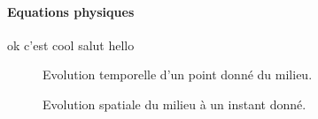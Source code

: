 \paragraph{Equations physiques}
ok
c'est cool
salut
hello
\begin{figure}[h]
    \centering
    \begin{minipage}{0.45\textwidth}
        \centering
        \caption{Evolution temporelle d'un point donné du milieu.~\cite{propagation-onde}}
    \end{minipage}
    \hfill
    \begin{minipage}{0.45\textwidth}
        \centering
        \caption{Evolution spatiale du milieu à un instant donné.~\cite{propagation-onde}}
    \end{minipage}
\end{figure}

